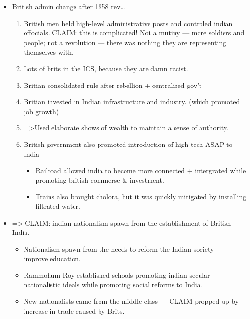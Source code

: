 \documentclass[letterpaper]{article}
\begin{document}
\begin{itemize}
\item British admin change after 1858 rev\ldots{}

\begin{enumerate}
\item British men held high-level administrative posts and controled
indian offocials. CLAIM: this is complicated! Not a mutiny --- more
soldiers and people; not a revolution --- there was nothing they
are representing themselves with.

\item Lots of brits in the ICS, because they are damn racist.
\item Britian consolidated rule after rebellion + centralized gov't

\item Britian invested in Indian infrastructure and industry. (which
promoted job growth)

\item =>Used elaborate shows of wealth to maintain a sense of authority.

\item British government also promoted introduction of high tech ASAP to
India

\begin{itemize}
\item Railroad allowed india to become more connected + intergrated
while promoting british commerse \& investment.
\item Trains also brought cholora, but it was quickly mitigated by
installing filtrated water.
\end{itemize}
\end{enumerate}

\item => CLAIM: indian nationalism spawn from the establishment of British
India.

\begin{itemize}
\item Nationalism spawn from the needs to reform the Indian society +
improve education.
\item Rammohum Roy established schools promoting indian secular
nationalistic ideals while promoting social reforms to India.
\item New nationalists came from the middle class --- CLAIM propped up by
increase in trade caused by Brits.
\end{itemize}
\end{itemize}
\end{document}
